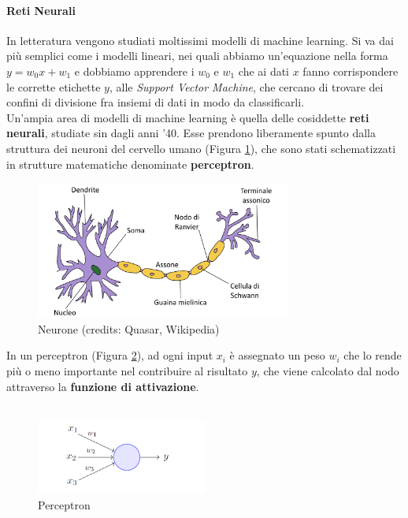 \paragraph{Reti Neurali} In letteratura vengono studiati moltissimi modelli di machine learning. Si va dai più semplici come i modelli lineari, nei quali abbiamo un'equazione nella forma $y = w_0x + w_1$ e dobbiamo apprendere i $w_0$ e $w_1$ che ai dati $x$ fanno corrispondere le corrette etichette $y$, alle \textit{Support Vector Machine}, che cercano di trovare dei confini di divisione fra insiemi di dati in modo da classificarli.\\
Un'ampia area di modelli di machine learning è quella delle cosiddette \textbf{reti neurali}, studiate sin dagli anni '40. Esse prendono liberamente spunto dalla struttura dei neuroni del cervello umano (Figura \ref{fig:neurone}), che sono stati schematizzati in strutture matematiche denominate \textbf{perceptron}.
\begin{figure}[h]
	\begin{center}
		\includegraphics[width=0.75\textwidth]{img/neurone.png}
		\caption{Neurone (credits: Quasar, Wikipedia)}
		\label{fig:neurone}
	\end{center}
\end{figure}
In un perceptron (Figura \ref{fig:perceptron}), ad ogni input $x_i$ è assegnato un peso $w_i$ che lo rende più o meno importante nel contribuire al risultato $y$, che viene calcolato dal nodo attraverso la \textbf{funzione di attivazione}.\\\\
\begin{figure}[h]
	\begin{center}
		\includegraphics[width=0.5\textwidth]{img/perceptron.png}
		\caption{Perceptron}
		\label{fig:perceptron}
	\end{center}
\end{figure}
